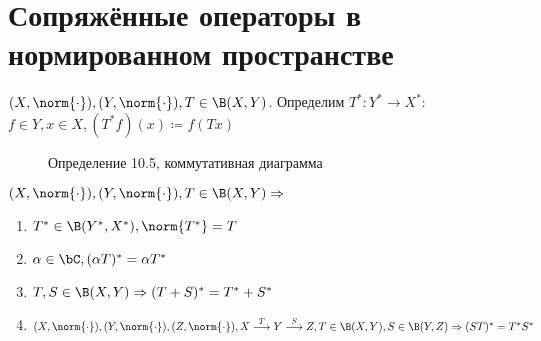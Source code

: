 \documentclass[document]{subfiles}
\begin{document}
\section{Сопряжённые операторы в нормированном пространстве}

\begin{definition}
    $(X, \norm{\cdot}), (Y, \norm{\cdot}), T \in \B(X,Y)$. Определим $T^* : Y^* \rightarrow X^*$: $f \in Y, x \in X, (T^* f)(x) \coloneqq f(Tx)$
\end{definition}

\begin{figure}
    \centering
    \caption{Определение 10.5, коммутативная диаграмма}
\end{figure}


\begin{theorem}
    $(X, \norm{\cdot}), (Y, \norm{\cdot}), T \in \B(X,Y) \Rightarrow$
    \begin{enumerate}
        \item $T^* \in \B(Y^*, X^*), \norm{T^*} = T$
        \item $\alpha \in \bC, (\alpha T)^* = \alpha T^*$
        \item $T, S \in \B(X,Y) \Rightarrow (T+S)^* = T^* + S^*$
        \item $(X, \norm{\cdot}), (Y, \norm{\cdot}), (Z, \norm{\cdot}), X \stackrel{T}{\longrightarrow} Y \stackrel{S}{\longrightarrow} Z, T \in \B(X,Y), S \in \B(Y,Z) \Rightarrow 
        (ST)^* = T^* S^* $
    \end{enumerate}
\end{theorem}
\end{document}
